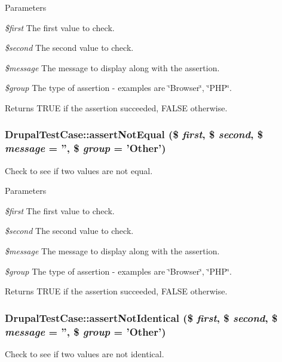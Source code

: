 \begin{DoxyParams}{Parameters}
\item[{\em \$first}]The first value to check. \item[{\em \$second}]The second value to check. \item[{\em \$message}]The message to display along with the assertion. \item[{\em \$group}]The type of assertion -\/ examples are \char`\"{}Browser\char`\"{}, \char`\"{}PHP\char`\"{}. \end{DoxyParams}
\begin{DoxyReturn}{Returns}
TRUE if the assertion succeeded, FALSE otherwise. 
\end{DoxyReturn}
\hypertarget{class_drupal_test_case_a76593bb498385ecbbfb9ea3721b1da83}{
\subsubsection[{assertNotEqual}]{\setlength{\rightskip}{0pt plus 5cm}DrupalTestCase::assertNotEqual (\$ {\em first}, \/  \$ {\em second}, \/  \$ {\em message} = {\ttfamily ''}, \/  \$ {\em group} = {\ttfamily 'Other'})}}
\label{class_drupal_test_case_a76593bb498385ecbbfb9ea3721b1da83}
Check to see if two values are not equal.


\begin{DoxyParams}{Parameters}
\item[{\em \$first}]The first value to check. \item[{\em \$second}]The second value to check. \item[{\em \$message}]The message to display along with the assertion. \item[{\em \$group}]The type of assertion -\/ examples are \char`\"{}Browser\char`\"{}, \char`\"{}PHP\char`\"{}. \end{DoxyParams}
\begin{DoxyReturn}{Returns}
TRUE if the assertion succeeded, FALSE otherwise. 
\end{DoxyReturn}
\hypertarget{class_drupal_test_case_a77cb46d51231f322d73e12a9ffa92b45}{
\subsubsection[{assertNotIdentical}]{\setlength{\rightskip}{0pt plus 5cm}DrupalTestCase::assertNotIdentical (\$ {\em first}, \/  \$ {\em second}, \/  \$ {\em message} = {\ttfamily ''}, \/  \$ {\em group} = {\ttfamily 'Other'})}}
\label{class_drupal_test_case_a77cb46d51231f322d73e12a9ffa92b45}
Check to see if two values are not identical.


